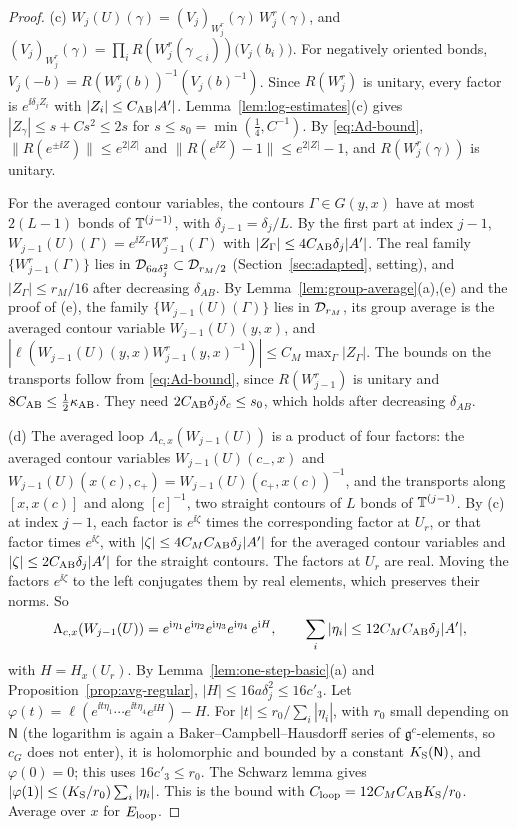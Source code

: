 \begin{proof}
(c) $W_j(U)(\gamma)=(V_j)_{W^r_j}(\gamma)\,W^r_j(\gamma)$, and $(V_j)_{W^r_j}(\gamma)=\prod_iR(W^r_j(\gamma_{<i}))\big(V_j(b_i)\big)$. For negatively oriented bonds, $V_j(-b)=R(W^r_j(b))^{-1}(V_j(b)^{-1})$. Since $R(W^r_j)$ is unitary, every factor is $e^{\ii\delta_jZ_i}$ with $|Z_i|\le C_{\rm AB}|A'|$. Lemma~\ref{lem:log-estimates}(c) gives $|Z_\gamma|\le s+Cs^2\le2s$ for $s\le s_0=\min(\frac14,C^{-1})$. By \eqref{eq:Ad-bound}, $\|R(e^{\pm\ii Z})\|\le e^{2|Z|}$ and $\|R(e^{\ii Z})-1\|\le e^{2|Z|}-1$, and $R(W^r_j(\gamma))$ is unitary.

For the averaged contour variables, the contours $\Gamma\in G(y,x)$ have at most $2(L-1)$ bonds of $\mathbb T^{(j-1)}$, with $\delta_{j-1}=\delta_j/L$. By the first part at index $j-1$, $W_{j-1}(U)(\Gamma)=e^{\ii Z_\Gamma}W^r_{j-1}(\Gamma)$ with $|Z_\Gamma|\le4C_{\rm AB}\delta_j|A'|$. The real family $\{W^r_{j-1}(\Gamma)\}$ lies in $\mathcal D_{6a\delta_j^2}\subset\mathcal D_{r_M/2}$ (Section~\ref{sec:adapted}, setting), and $|Z_\Gamma|\le r_M/16$ after decreasing $\delta_{AB}$. By Lemma~\ref{lem:group-average}(a),(e) and the proof of (e), the family $\{W_{j-1}(U)(\Gamma)\}$ lies in $\mathcal D_{r_M}$, its group average is the averaged contour variable $W_{j-1}(U)(y,x)$, and $|\ell(W_{j-1}(U)(y,x)W^r_{j-1}(y,x)^{-1})|\le C_M\max_\Gamma|Z_\Gamma|$. The bounds on the transports follow from \eqref{eq:Ad-bound}, since $R(W^r_{j-1})$ is unitary and $8C_{\rm AB}\le\frac12\kappa_{\rm AB}$. They need $2C_{\rm AB}\delta_j\delta_c\le s_0$, which holds after decreasing $\delta_{AB}$.

(d) The averaged loop $\Lambda_{c,x}(W_{j-1}(U))$ is a product of four factors: the averaged contour variables $W_{j-1}(U)(c_-,x)$ and $W_{j-1}(U)(x(c),c_+)=W_{j-1}(U)(c_+,x(c))^{-1}$, and the transports along $[x,x(c)]$ and along $[c]^{-1}$, two straight contours of $L$ bonds of $\mathbb T^{(j-1)}$. By (c) at index $j-1$, each factor is $e^{\ii\zeta}$ times the corresponding factor at $U_r$, or that factor times $e^{\ii\zeta}$, with $|\zeta|\le4C_MC_{\rm AB}\delta_j|A'|$ for the averaged contour variables and $|\zeta|\le2C_{\rm AB}\delta_j|A'|$ for the straight contours. The factors at $U_r$ are real. Moving the factors $e^{\ii\zeta}$ to the left conjugates them by real elements, which preserves their norms. So
\[
\Lambda_{c,x}(W_{j-1}(U))=e^{\mathrm i\eta_1}e^{\mathrm i\eta_2}e^{\mathrm i\eta_3}e^{\mathrm i\eta_4}\,e^{\mathrm i H},\qquad\sum_i|\eta_i|\le12C_MC_{\rm AB}\delta_j|A'|,
\]
with $H=H_x(U_r)$. By Lemma~\ref{lem:one-step-basic}(a) and Proposition~\ref{prop:avg-regular}, $|H|\le16a\delta_j^2\le16c'_3$. Let $\varphi(t)=\ell(e^{\ii t\eta_1}\cdots e^{\ii t\eta_4}e^{\ii H})-H$. For $|t|\le r_0/\sum_i|\eta_i|$, with $r_0$ small depending on $\mathsf N$ (the logarithm is again a Baker--Campbell--Hausdorff series of $\mathfrak g^c$-elements, so $c_G$ does not enter), it is holomorphic and bounded by a constant $K_{\rm S}(\mathsf N)$, and $\varphi(0)=0$; this uses $16c'_3\le r_0$. The Schwarz lemma gives $|\varphi(1)|\le(K_{\rm S}/r_0)\sum_i|\eta_i|$. This is the bound with $C_{\rm loop}=12C_MC_{\rm AB}K_{\rm S}/r_0$. Average over $x$ for $E_{\rm loop}$.
\end{proof}


